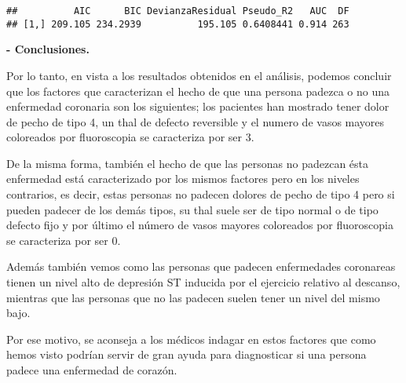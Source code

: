 \documentclass[]{article}
\begin{document}
\begin{verbatim}
##          AIC      BIC DevianzaResidual Pseudo_R2   AUC  DF
## [1,] 209.105 234.2939          195.105 0.6408441 0.914 263
\end{verbatim}

\textbf{- Conclusiones.}

Por lo tanto, en vista a los resultados obtenidos en el análisis,
podemos concluir que los factores que caracterizan el hecho de que una
persona padezca o no una enfermedad coronaria son los siguientes; los
pacientes han mostrado tener dolor de pecho de tipo 4, un thal de
defecto reversible y el numero de vasos mayores coloreados por
fluoroscopia se caracteriza por ser 3.

De la misma forma, también el hecho de que las personas no padezcan ésta
enfermedad está caracterizado por los mismos factores pero en los
niveles contrarios, es decir, estas personas no padecen dolores de pecho
de tipo 4 pero si pueden padecer de los demás tipos, su thal suele ser
de tipo normal o de tipo defecto fijo y por último el número de vasos
mayores coloreados por fluoroscopia se caracteriza por ser 0.

Además también vemos como las personas que padecen enfermedades
coronareas tienen un nivel alto de depresión ST inducida por el
ejercicio relativo al descanso, mientras que las personas que no las
padecen suelen tener un nivel del mismo bajo.

Por ese motivo, se aconseja a los médicos indagar en estos factores que
como hemos visto podrían servir de gran ayuda para diagnosticar si una
persona padece una enfermedad de corazón.
\end{document}
